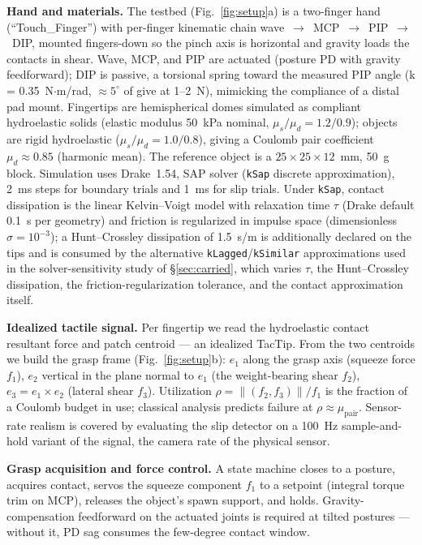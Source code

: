 \documentclass[journal]{IEEEtran}
\newcommand{\mupair}{\mu_{\mathrm{pair}}}
\begin{document}
\textbf{Hand and materials.} The testbed (Fig.~\ref{fig:setup}a) is a
two-finger hand (``Touch\_Finger'') with per-finger kinematic chain
wave~$\to$~MCP~$\to$~PIP~$\to$~DIP, mounted fingers-down so the pinch axis
is horizontal and gravity loads the contacts in shear. Wave, MCP, and PIP
are actuated (posture PD with gravity feedforward); DIP is passive, a
torsional spring toward the measured PIP angle (k = 0.35~N$\cdot$m/rad,
${\approx}5^\circ$ of give at 1--2~N), mimicking the compliance of a distal
pad mount. Fingertips are hemispherical domes simulated as compliant
hydroelastic solids (elastic modulus 50~kPa nominal,
$\mu_s/\mu_d = 1.2/0.9$); objects are rigid hydroelastic
($\mu_s/\mu_d = 1.0/0.8$), giving a Coulomb pair coefficient
$\mu_d \approx 0.85$ (harmonic mean). The reference object is a
$25 \times 25 \times 12$~mm, 50~g block. Simulation uses Drake~1.54, SAP
solver (\texttt{kSap} discrete approximation), 2~ms steps for boundary
trials and 1~ms for slip trials. Under \texttt{kSap}, contact dissipation
is the linear Kelvin--Voigt model with relaxation time $\tau$ (Drake
default 0.1~s per geometry) and friction is regularized in impulse space
(dimensionless $\sigma = 10^{-3}$); a Hunt--Crossley dissipation of
1.5~s/m is additionally declared on the tips and is consumed by the
alternative \texttt{kLagged}/\texttt{kSimilar} approximations used in the
solver-sensitivity study of \S\ref{sec:carried}, which varies $\tau$, the
Hunt--Crossley dissipation, the friction-regularization tolerance, and
the contact approximation itself.

\textbf{Idealized tactile signal.} Per fingertip we read the hydroelastic
contact resultant force and patch centroid --- an idealized TacTip. From
the two centroids we build the grasp frame (Fig.~\ref{fig:setup}b): $e_1$
along the grasp axis (squeeze force $f_1$), $e_2$ vertical in the plane
normal to $e_1$ (the weight-bearing shear $f_2$),
$e_3 = e_1 \times e_2$ (lateral shear $f_3$). Utilization
$\rho = \lVert (f_2, f_3) \rVert / f_1$ is the fraction of a Coulomb budget
in use; classical analysis predicts failure at $\rho \approx \mupair$.
Sensor-rate realism is covered by evaluating the slip detector on a 100~Hz
sample-and-hold variant of the signal, the camera rate of the physical
sensor.

\textbf{Grasp acquisition and force control.} A state machine closes to a
posture, acquires contact, servos the squeeze component $f_1$ to a setpoint
(integral torque trim on MCP), releases the object's spawn support, and
holds. Gravity-compensation feedforward on the actuated joints is required
at tilted postures --- without it, PD sag consumes the few-degree contact
window.
\end{document}
